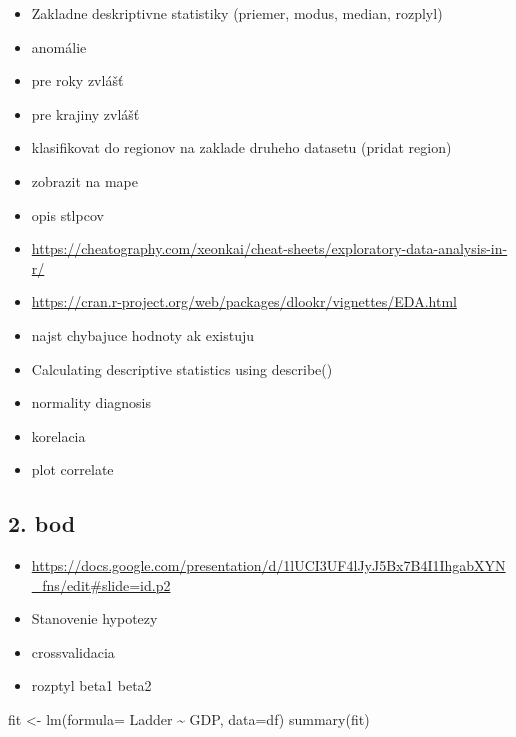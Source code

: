 \documentclass[
]{article}
\newenvironment{Shaded}{\begin{snugshade}}{\end{snugshade}}
\newcommand{\AttributeTok}[1]{\textcolor[rgb]{0.77,0.63,0.00}{#1}}
\newcommand{\FunctionTok}[1]{\textcolor[rgb]{0.00,0.00,0.00}{#1}}
\newcommand{\NormalTok}[1]{#1}
\newcommand{\OtherTok}[1]{\textcolor[rgb]{0.56,0.35,0.01}{#1}}
\newcommand{\SpecialCharTok}[1]{\textcolor[rgb]{0.00,0.00,0.00}{#1}}
\providecommand{\tightlist}{%
  \setlength{\itemsep}{0pt}\setlength{\parskip}{0pt}}
\begin{document}
\begin{itemize}
\tightlist
\item
  Zakladne deskriptivne statistiky (priemer, modus, median, rozplyl)
\item
  anomálie
\item
  pre roky zvlášť
\item
  pre krajiny zvlášť
\item
  klasifikovat do regionov na zaklade druheho datasetu (pridat region)
\item
  zobrazit na mape
\item
  opis stlpcov
\item
  \url{https://cheatography.com/xeonkai/cheat-sheets/exploratory-data-analysis-in-r/}
\item
  \url{https://cran.r-project.org/web/packages/dlookr/vignettes/EDA.html}
\item
  najst chybajuce hodnoty ak existuju
\item
  Calculating descriptive statistics using describe()
\item
  normality diagnosis
\item
  korelacia
\item
  plot correlate
\end{itemize}

\hypertarget{bod}{%
\subsection{2. bod}\label{bod}}

\begin{itemize}
\tightlist
\item
  \url{https://docs.google.com/presentation/d/1lUCI3UF4lJyJ5Bx7B4I1IhgabXYN_fns/edit\#slide=id.p2}
\item
  Stanovenie hypotezy
\item
  crossvalidacia
\item
  rozptyl beta1 beta2
\end{itemize}

\begin{Shaded}
\begin{Highlighting}[]
\NormalTok{fit }\OtherTok{\textless{}{-}} \FunctionTok{lm}\NormalTok{(}\AttributeTok{formula=}\NormalTok{ Ladder }\SpecialCharTok{\textasciitilde{}}\NormalTok{ GDP, }\AttributeTok{data=}\NormalTok{df)}
\FunctionTok{summary}\NormalTok{(fit)}
\end{Highlighting}
\end{Shaded}
\end{document}
